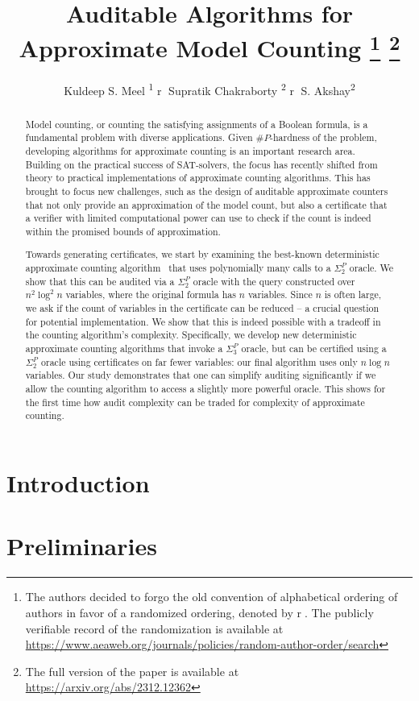 \documentclass[letterpaper]{article}
\title{Auditable Algorithms for Approximate Model Counting
\thanks{
	The authors decided to forgo the old convention of alphabetical ordering of authors in favor of a
	randomized ordering, denoted by \textcircled{r}. The publicly verifiable record of the randomization is available at
	\protect\url{https://www.aeaweb.org/journals/policies/random-author-order/search}
}
\thanks{The full version of the paper is available at \protect\url{https://arxiv.org/abs/2312.12362}}
}
\author{
     
Kuldeep S. Meel \textsuperscript{\rm 1} \textcircled{r}
Supratik Chakraborty \textsuperscript{\rm 2} \textcircled{r}
S. Akshay\textsuperscript{\rm 2} 
}
\begin{document}
\maketitle

\begin{abstract}
Model counting, or counting the satisfying assignments of a Boolean
formula, is a fundamental problem with diverse applications.  Given
$\#P$-hardness of the problem, developing algorithms for approximate
counting is an important research area. Building on the practical
success of SAT-solvers, the focus has recently shifted from theory to
practical implementations of approximate counting algorithms. This has
brought to focus new challenges, such as the design of auditable
approximate counters that not only provide an approximation of the
model count, but also a certificate that a verifier with limited
computational power can use to check if the count is indeed within the
promised bounds of approximation.

Towards generating certificates, we start by examining the best-known
deterministic approximate counting algorithm~\cite{stockmeyer} that
uses polynomially many calls to a $\Sigma_2^P$ oracle. We show that
this can be audited via a $\Sigma_2^P$ oracle with the query constructed over 
$n^2 \log^2 n$ variables, where the original formula has $n$
variables.  Since $n$ is often large, we ask if the count of variables
in the certificate can be reduced -- a crucial question for potential
implementation. We show that this is indeed possible with a tradeoff
in the counting algorithm's complexity. Specifically, we develop new
deterministic approximate counting algorithms that invoke a
$\Sigma_3^P$ oracle, but can be certified using a $\Sigma_2^P$ oracle
using certificates on far fewer variables: our final algorithm uses only $n \log n$ variables.
Our study demonstrates that one can simplify auditing significantly if
we allow the counting algorithm to access a slightly more powerful
oracle. This shows for the first time how audit complexity can be
traded for complexity of approximate counting.
\end{abstract}
\section{Introduction}
\label{sec:intro}


\section{Preliminaries}
\label{sec:prelim}

\end{document}
